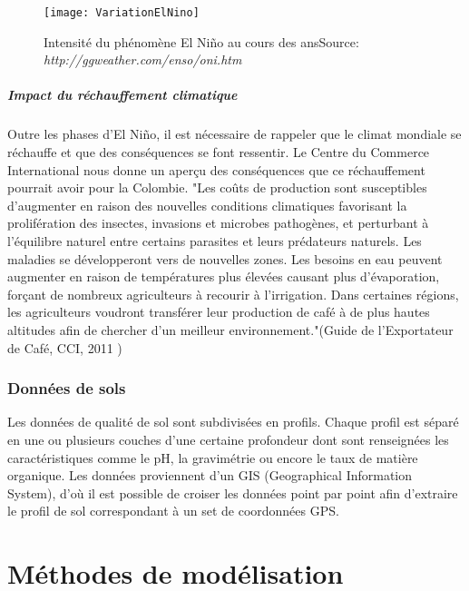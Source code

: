 \begin{figure}[H]
	\texttt{[image: VariationElNino]}
	\caption{\label{Nino} Intensité du phénomène El Niño au cours des ans\newline Source: \textit{http://ggweather.com/enso/oni.htm}}
\end{figure}

\paragraph{Impact du réchauffement climatique} Outre les phases d'El Niño, il est nécessaire de rappeler que le climat mondiale se réchauffe et que des conséquences se font ressentir. Le Centre du Commerce International \cite{CCI} nous donne un aperçu des conséquences que ce réchauffement pourrait avoir pour la Colombie. "Les coûts de production sont susceptibles d'augmenter en raison des nouvelles conditions climatiques favorisant la prolifération des insectes, invasions et microbes pathogènes, et perturbant à l'équilibre naturel entre certains parasites et leurs prédateurs naturels. Les maladies se développeront vers de nouvelles zones. Les besoins en eau peuvent augmenter en raison de températures plus élevées causant plus d'évaporation, forçant de nombreux agriculteurs à recourir à l'irrigation. Dans certaines régions, les agriculteurs voudront transférer leur production de café à de plus hautes altitudes afin de chercher d'un meilleur environnement."(Guide de l'Exportateur de Café, CCI, 2011 \cite{GuideCafe})


\subsection{Données de sols} 
Les données de qualité de sol sont subdivisées en profils. Chaque profil est séparé en une ou plusieurs couches d’une certaine profondeur dont sont renseignées les caractéristiques comme le pH, la gravimétrie ou encore le taux de matière organique. Les données proviennent d'un GIS (Geographical Information System), d'où il est possible de croiser les données point par point afin d'extraire le profil de sol correspondant à un set de coordonnées GPS. 





\chapter{Méthodes de modélisation}

